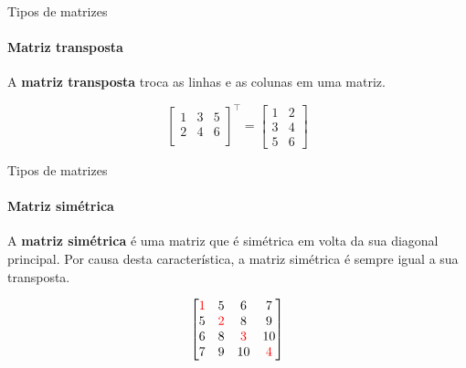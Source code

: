\begin{frame}[t]{Tipos de matrizes} 
    \framesubtitle{Matriz transposta}

    A \textbf{matriz transposta} troca as linhas e as colunas em uma matriz.
    
    \vspace*{0.8cm}

    \begin{equation}
        \begin{bmatrix}
            1 & 3 & 5\\
            2 & 4 & 6\\
         \end{bmatrix}^\top =
            \begin{bmatrix}
            1 & 2 \\
            3 & 4 \\
            5 & 6   
         \end{bmatrix}
    \end{equation}
    \vspace*{0.3cm}
\end{frame}
\begin{frame}[t]{Tipos de matrizes} 
    \framesubtitle{Matriz simétrica}

    A \textbf{matriz simétrica} é uma matriz que é simétrica em volta da sua diagonal principal. Por causa desta característica, a matriz simétrica é sempre igual a sua transposta. 
    
    \vspace*{0.8cm}

    \begin{equation}
            \begin{bmatrix}
            \textcolor{red}{1} & 5 & 6 & 7\\
            5 & \textcolor{red}{2} & 8 & 9\\
            6 & 8 & \textcolor{red}{3} & 10\\ 
            7 & 9 & 10 & \textcolor{red}{4}\\ 
         \end{bmatrix}
    \end{equation}
    \vspace*{0.3cm}
\end{frame}
